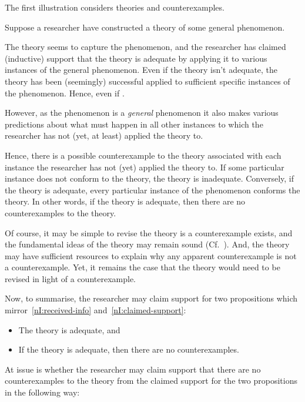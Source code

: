 \begin{note}
  The first illustration considers theories and counterexamples.

  \begin{illustration}\label{ill:CE:main}
    Suppose a researcher have constructed a theory of some general phenomenon.

    The theory seems to capture the phenomenon, and the researcher has claimed (inductive) support that the theory is adequate by applying it to various instances of the general phenomenon.
    Even if the theory isn't adequate, the theory has been (seemingly) successful applied to sufficient specific instances of the phenomenon.
    Hence, even if \mom{}.

    However, as the phenomenon is a \emph{general} phenomenon it also makes various predictions about what must happen in all other instances to which the researcher has not (yet, at least) applied the theory to.

    Hence, there is a possible counterexample to the theory associated with each instance the researcher has not (yet) applied the theory to.
    If some particular instance does not conform to the theory, the theory is inadequate.
    Conversely, if the theory is adequate, every particular instance of the phenomenon conforms the theory.
    In other words, if the theory is adequate, then there are no counterexamples to the theory.

    Of course, it may be simple to revise the theory is a counterexample exists, and the fundamental ideas of the theory may remain sound (Cf.~\textcite{Bonevac:2011tz}).
    And, the theory may have sufficient resources to explain why any apparent counterexample is not a counterexample.
    Yet, it remains the case that the theory would need to be revised in light of a counterexample.

    Now, to summarise, the researcher may claim support for two propositions which mirror~\ref{nI:received-info} and~\ref{nI:claimed-support}:

    \begin{itemize}
    \item The theory is adequate, and
    \item If the theory is adequate, then there are no counterexamples.
    \end{itemize}

    At issue is whether the researcher may claim support that there are no counterexamples to the theory from the claimed support for the two propositions in the following way:


\end{illustration}
\end{note}
